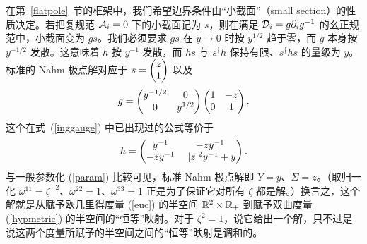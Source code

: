 在第~\ref{flatpole}~节的框架中，我们希望边界条件由“小截面”（small section）的性质决定。若把复规范 $\A_i=0$ 下的小截面记为 $s$，则在满足 $\D_i=g\partial_i g^{-1}$ 的幺正规范中，小截面变为 $gs$。我们必须要求 $g s$ 在 $y \to 0$ 时按 $y^{1/2}$ 趋于零，而 $g$ 本身按 $y^{-1/2}$ 发散。这意味着 $h$ 按 $y^{-1}$ 发散，而 $hs$ 与 $s^\dagger h$ 保持有限、$s^\dagger h s$ 的量级为 $y$。标准的 Nahm 极点解对应于 $ s=\begin{pmatrix}z \cr 1\end{pmatrix}$ 以及
\begin{equation}\label{zelm}
g = \begin{pmatrix} 
y^{-1/2} & 0 \cr 0 & y^{1/2}\end{pmatrix} \begin{pmatrix} 1 & -z \cr 0 & 1\end{pmatrix}.
\end{equation}
这个在式~(\ref{inggauge}) 中已出现过的公式等价于
\begin{equation}
h = \begin{pmatrix} y^{-1} & -z y^{-1}  \cr - \bar z y^{-1} &~ |z|^2 y^{-1} + y \end{pmatrix} .
\end{equation}
与一般参数化 (\ref{param}) 比较可见，标准 Nahm 极点解即 $Y=y$、$\Sigma=z$。（取归一化 $\omega^{11} = \zeta^{-2}$、$\omega^{22} = 1$、$\omega^{33}=1$ 正是为了保证它对所有 $\zeta$ 都是解。）换言之，这个解就是从赋予欧几里得度量 (\ref{euc}) 的半空间 $\R^2\times\R_+$ 到赋予双曲度量 (\ref{hypmetric}) 的半空间的“恒等”映射。对于 $\zeta^2=1$，说它给出一个解，只不过是说这两个度量所赋予的半空间之间的“恒等”映射是调和的。


